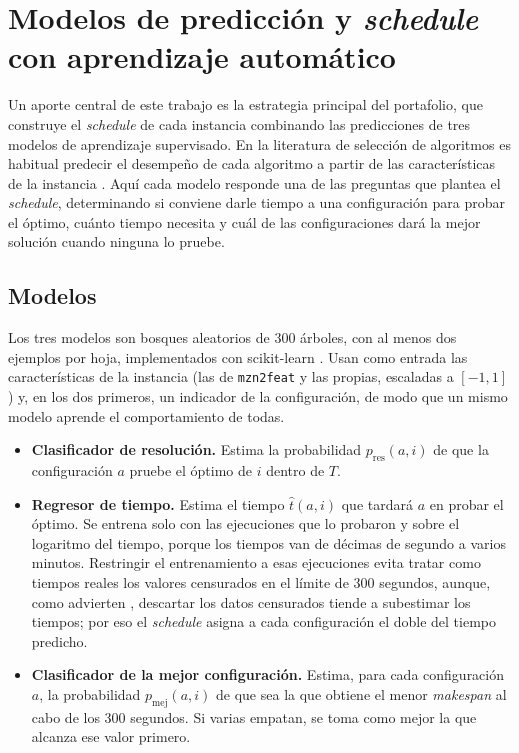 \section{Modelos de predicción y \textit{schedule} con aprendizaje automático}
\label{sec:modelos_prediccion}

Un aporte central de este trabajo es la estrategia principal del portafolio,
que construye el \textit{schedule} de cada instancia combinando las
predicciones de tres modelos de aprendizaje supervisado. En la literatura de
selección de algoritmos es habitual predecir el desempeño de cada algoritmo a
partir de las características de la instancia \citep{xu2008satzilla,
hutter2014}. Aquí cada modelo responde una de las preguntas que plantea el
\textit{schedule}, determinando si conviene darle tiempo a una configuración
para probar el óptimo, cuánto tiempo necesita y cuál de las configuraciones
dará la mejor solución cuando ninguna lo pruebe.

\subsection{Modelos}
Los tres modelos son bosques aleatorios \citep{breiman2001} de 300 árboles,
con al menos dos ejemplos por hoja, implementados con scikit-learn
\citep{pedregosa2011}. Usan como entrada las características de la instancia
(las de \texttt{mzn2feat} y las propias, escaladas a $[-1, 1]$) y, en los dos
primeros, un indicador de la configuración, de modo que un mismo modelo
aprende el comportamiento de todas.

\begin{itemize}
  \item \textbf{Clasificador de resolución.} Estima la probabilidad
    $p_{\mathrm{res}}(a, i)$ de que la configuración $a$ pruebe el óptimo de
    $i$ dentro de $T$.
  \item \textbf{Regresor de tiempo.} Estima el tiempo $\hat{t}(a, i)$ que
    tardará $a$ en probar el óptimo. Se entrena solo con las ejecuciones que
    lo probaron y sobre el logaritmo del tiempo, porque los tiempos van de
    décimas de segundo a varios minutos. Restringir el entrenamiento a esas
    ejecuciones evita tratar como tiempos reales los valores censurados en el
    límite de 300 segundos, aunque, como advierten \citet{hutter2014},
    descartar los datos censurados tiende a subestimar los tiempos; por eso el
    \textit{schedule} asigna a cada configuración el doble del tiempo predicho.
  \item \textbf{Clasificador de la mejor configuración.} Estima, para cada
    configuración $a$, la probabilidad $p_{\mathrm{mej}}(a, i)$ de que sea la
    que obtiene el menor \textit{makespan} al cabo de los 300 segundos. Si
    varias empatan, se toma como mejor la que alcanza ese valor primero.
\end{itemize}

